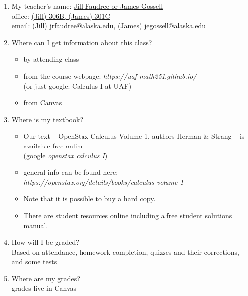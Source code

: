 \documentclass[11pt,fleqn]{article}
\begin{document}
\renewcommand{\headrulewidth}{0pt}
\newcommand{\blank}[1]{\rule{#1}{0.75pt}}
\renewcommand{\d}{\displaystyle}
\vspace*{-0.7in}
\begin{center}
  \large {}
\end{center}


\begin{enumerate}
\item My teacher's name: \underline{Jill Faudree or James Gossell}\\ office:  \underline{(Jill) 306B, (James) 301C}\\ email:  \underline{(Jill) jrfaudree@alaska.edu, (James) jegossell@alaska.edu}\\

\item Where can I get information about this class?\\
\begin{itemize}
\item by attending class
\item from the course webpage: \textit{https://uaf-math251.github.io/} \\(or just google: Calculus I at UAF)
\item from Canvas
\end{itemize}

\vfill
\item Where is my textbook?\\
\begin{itemize}
\item Our text -- OpenStax Calculus Volume 1, authors Herman \& Strang -- is available free online. \\
(google \emph{openstax calculus I})
\item general info can be found here: \textit{https://openstax.org/details/books/calculus-volume-1} 
\item Note that it is possible to buy a hard copy. 
\item There are student resources online including a free student solutions manual.
\end{itemize}
\vfill
\item How will I be graded? \\
Based on attendance, homework completion, quizzes and their corrections, and some tests
\vfill

\item Where are my grades?\\
grades live in Canvas
\vfill


\end{enumerate}
\end{document}
